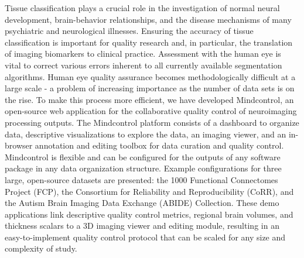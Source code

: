 Tissue classification plays a crucial role in the investigation of normal neural development, brain-behavior relationships, and the disease mechanisms of many psychiatric and neurological illnesses. Ensuring the accuracy of tissue classification is important for quality research and, in particular, the translation of imaging biomarkers to clinical practice. Assessment with the human eye is vital to correct various errors inherent to all currently available segmentation algorithms. Human eye quality assurance becomes methodologically difficult at a large scale - a problem of increasing importance as the number of data sets is on the rise. To make this process more efficient, we have developed Mindcontrol, an open-source web application for the collaborative quality control of neuroimaging processing outputs. The Mindcontrol platform consists of a dashboard to organize data, descriptive visualizations to explore the data, an imaging viewer, and an in-browser annotation and editing toolbox for data curation and quality control. Mindcontrol is flexible and can be configured for the outputs of any software package in any data organization structure. Example configurations for three large, open-source datasets are presented: the 1000 Functional Connectomes Project (FCP), the Consortium for Reliability and Reproducibility (CoRR), and the Autism Brain Imaging Data Exchange (ABIDE) Collection. These demo applications link descriptive quality control metrics, regional brain volumes, and thickness scalars to a 3D imaging viewer and editing module, resulting in an easy-to-implement quality control protocol that can be scaled for any size and complexity of study.